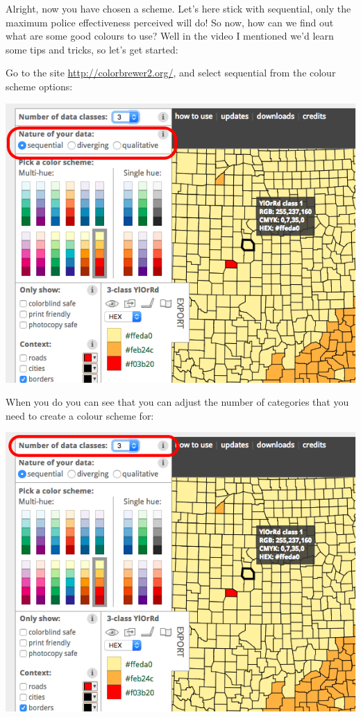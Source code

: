 \documentclass[
]{book}
\begin{document}
Alright, now you have chosen a scheme. Let's here stick with sequential, only the maximum police effectiveness perceived will do! So now, how can we find out what are some good colours to use? Well in the video I mentioned we'd learn some tips and tricks, so let's get started:

Go to the site \url{http://colorbrewer2.org/}, and select sequential from the colour scheme options:

\includegraphics{imgs/choose_col_vartyp.png}

When you do you can see that you can adjust the number of categories that you need to create a colour scheme for:

\includegraphics{imgs/choose_col_num.png}
\end{document}

